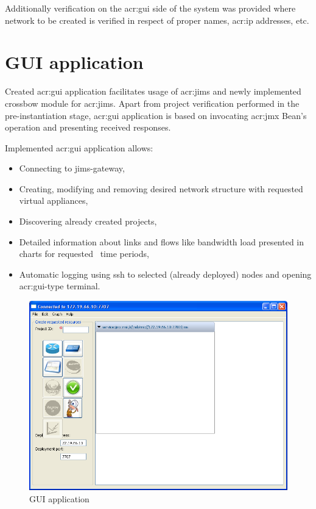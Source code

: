 \documentclass[11pt]{book}
\begin{document}
      Additionally verification on the \gls{acr:gui} side of the system was provided where network to be created is
      verified in respect of proper names, \gls{acr:ip} addresses, etc.

	\section{GUI application}
		\label{sec:impl:gui}
		
		Created \gls{acr:gui} application facilitates usage of \gls{acr:jims} and newly implemented crossbow module for \gls{acr:jims}. Apart from project verification 
                performed in the pre-instantiation stage, \gls{acr:gui} application is based on invocating \gls{acr:jmx} Bean's operation and presenting received responses.

		Implemented \gls{acr:gui} application allows:
		\begin{itemize}
			\item{Connecting to jims-gateway,}
			\item{Creating, modifying and removing desired network structure with requested virtual appliances,}
			\item{Discovering already created projects,}
			\item{Detailed information about links and flows like bandwidth load presented in charts for requested \
				time periods,}
			\item{Automatic logging using ssh to selected (already deployed) nodes and opening \gls{acr:gui}-type terminal.}
		\end{itemize}		

		\begin{figure}[H]
			\begin{center}
				\includegraphics[width=1.0\textwidth]{img/impl/gui.png}
			\end{center}
			\caption{GUI application}
		\end{figure}
\end{document}
